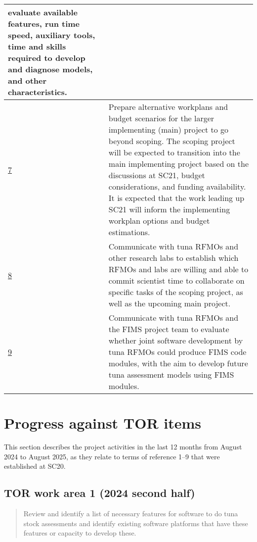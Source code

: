 \documentclass{SCreport}
\begin{document}
\begin{table}
\begin{tabular}{p{1cm}p{13cm}}
          evaluate available features, run time speed, auxiliary tools, time and
          skills required to develop and diagnose models, and other
          characteristics.\\
    \hline
    \hyperlink{link:tor-7}{7}
        & Prepare alternative workplans and budget scenarios for the larger
          implementing (main) project to go beyond scoping. The scoping project
          will be expected to transition into the main implementing project
          based on the discussions at SC21, budget considerations, and funding
          availability. It is expected that the work leading up SC21 will inform
          the implementing workplan options and budget estimations.\\
    \hline
    \hyperlink{link:tor-8}{8}
        & Communicate with tuna RFMOs and other research labs to establish which
          RFMOs and labs are willing and able to commit scientist time to
          collaborate on specific tasks of the scoping project, as well as the
          upcoming main project.\\
    \hline
    \hyperlink{link:tor-9}{9}
        & Communicate with tuna RFMOs and the FIMS project team to evaluate
          whether joint software development by tuna RFMOs could produce FIMS
          code modules, with the aim to develop future tuna assessment models
          using FIMS modules.\\
    \hline
  \end{tabular}
\end{table}

\clearpage

\section{Progress against TOR items}

This section describes the project activities in the last 12 months from August
2024 to August 2025, as they relate to terms of reference 1--9 that were
established at SC20.

\vspace{1ex}

\hypertarget{link:tor-1}{}
\subsection{TOR work area 1 (2024 second half)}
\label{sec:tor-1}

\begin{quote}\sf
  Review and identify a list of necessary features for software to do tuna stock
  assessments and identify existing software platforms that have these features
  or capacity to develop these.
\end{quote}
\end{document}
